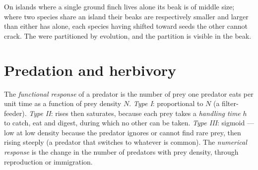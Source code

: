 \begin{example}\label{ex:b1:species-interactions:finches}
On islands where a single ground finch lives alone its beak is of
middle size; where two species share an island their beaks are
respectively smaller and larger than either has alone, each species
having shifted toward seeds the other cannot crack. The  were
partitioned by evolution, and the partition is visible in the beak.
\end{example}

\section{Predation and herbivory}

\begin{definition}\label{def:b1:species-interactions:functional}
The \emph{functional response} of a predator is the number of prey
one predator eats per unit time as a function of prey density $N$.
\emph{Type I}: proportional to $N$ (a filter-feeder). \emph{Type II}:
rises then saturates, because each prey takes a \emph{handling time}
$h$ to catch, eat and digest, during which no other can be taken.
\emph{Type III}: sigmoid --- low at low density because the predator
ignores or cannot find rare prey, then rising steeply (a predator that
switches to whatever is common). The \emph{numerical response} is the
change in the number of predators with prey density, through
reproduction or immigration.
\end{definition}

